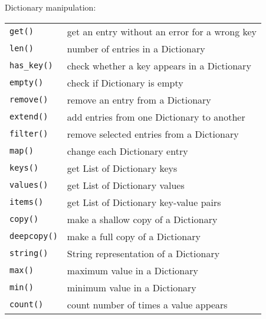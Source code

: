Dictionary manipulation:
\label{dict-functions}
\begin{center} \begin{tabular}{l l}
				\verb!get()! & get an entry without an error for a wrong key \\
				\verb!len()! & number of entries in a Dictionary \\
				\verb!has_key()! & check whether a key appears in a Dictionary \\
				\verb!empty()! & check if Dictionary is empty \\
				\verb!remove()! & remove an entry from a Dictionary \\
				\verb!extend()! & add entries from one Dictionary to another \\
				\verb!filter()! & remove selected entries from a Dictionary \\
				\verb!map()! & change each Dictionary entry \\
				\verb!keys()! & get List of Dictionary keys \\
				\verb!values()! & get List of Dictionary values \\
				\verb!items()! & get List of Dictionary key-value pairs \\
				\verb!copy()! & make a shallow copy of a Dictionary \\
				\verb!deepcopy()! & make a full copy of a Dictionary \\
				\verb!string()! & String representation of a Dictionary \\
				\verb!max()! & maximum value in a Dictionary \\
				\verb!min()! & minimum value in a Dictionary \\
				\verb!count()! & count number of times a value appears \\
\end{tabular} \end{center}


